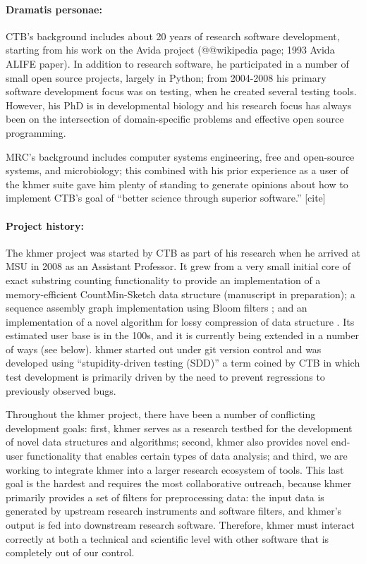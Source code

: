 \documentclass[11pt]{article}
\begin{document}
\paragraph{Dramatis personae:}
CTB's background includes about 20 years of research software
development, starting from his work on the Avida project (@@wikipedia
page; 1993 Avida ALIFE paper).  In addition to research software, he
participated in a number of small open source projects, largely in
Python; from 2004-2008 his primary software development focus was on
testing, when he created several testing tools.  However, his PhD is
in developmental biology and his research focus has always been on the
intersection of domain-specific problems and effective open source
programming.

MRC's background includes computer systems engineering, free and
open-source systems, and microbiology; this combined with his prior
experience as a user of the khmer suite gave him plenty of standing to
generate opinions about how to implement CTB's goal of ``better
science through superior software.''  [cite]

\paragraph{Project history:}
The khmer project was started by CTB as part of his research when he
arrived at MSU in 2008 as an Assistant Professor.  It grew from a very
small initial core of exact substring counting functionality to
provide an implementation of a memory-efficient CountMin-Sketch data
structure (manuscript in preparation); a sequence assembly graph
implementation using Bloom filters \cite{kmer-percolation}; and an
implementation of a novel algorithm for lossy compression of data
structure \cite{diginorm}.  Its estimated user base is in the 100s,
and it is currently being extended in a number of ways (see below).
khmer started out under git version control and was developed using
``stupidity-driven testing (SDD)'' a term coined by CTB in which test
development is primarily driven by the need to prevent regressions to
previously observed bugs.

Throughout the khmer project, there have been a number of conflicting
development goals: first, khmer serves as a research testbed for the
development of novel data structures and algorithms; second, khmer
also provides novel end-user functionality that enables certain types
of data analysis; and third, we are working to integrate khmer into a
larger research ecosystem of tools.  This last goal is the hardest
and requires the most collaborative outreach, because khmer
primarily provides a set of filters for preprocessing data: the input
data is generated by upstream research instruments and software
filters, and khmer's output is fed into downstream research software.
Therefore, khmer must interact correctly at both a technical and
scientific level with other software that is completely out of our
control.
\end{document}
